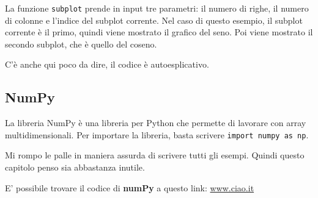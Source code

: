 La funzione \texttt{subplot} prende in input tre parametri: il numero di righe,
il numero di colonne e l'indice del subplot corrente. Nel caso di questo
esempio, il subplot corrente è il primo, quindi viene mostrato il grafico del
seno. Poi viene mostrato il secondo subplot, che è quello del coseno.



C'è anche qui poco da dire, il codice è autoesplicativo.

\subsection{NumPy}

La libreria NumPy è una libreria per Python che permette di lavorare con
array multidimensionali. Per importare la libreria, basta scrivere
\texttt{import numpy as np}.

Mi rompo le palle in maniera assurda di scrivere tutti gli esempi. Quindi questo capitolo 
penso sia abbastanza inutile.


E' possibile trovare il codice di \textbf{numPy} a questo link: \url{www.ciao.it}